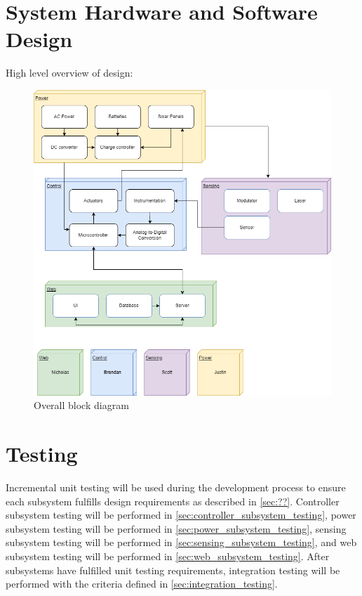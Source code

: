\documentclass[12pt]{article}
\begin{document}
\section{System Hardware and Software Design}   %
High level overview of design:
\begin{figure}[H]
    \caption{Overall block diagram}
    \centering
    \includegraphics[width=\textwidth]{images/Overall Block Diagram.png}
\end{figure}
\section{Testing}                               %
Incremental unit testing will be used during the development process
to ensure each subsystem fulfills design requirements as described in
\autoref{sec:??}. Controller subsystem testing will be performed in
\autoref{sec:controller_subsystem_testing}, power subsystem testing will be
performed in \autoref{sec:power_subsystem_testing}, sensing subsystem testing
will be performed in \autoref{sec:sensing_subsystem_testing}, and web subsystem
testing will be performed in \autoref{sec:web_subsystem_testing}. After
subsystems have fulfilled unit testing requirements, integration testing will
be performed with the criteria defined in \autoref{sec:integration_testing}.
\end{document}
